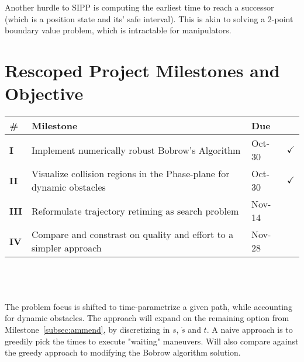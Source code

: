 \documentclass[letterpaper,11pt]{article} %
\begin{document}
Another hurdle to SIPP is computing the earliest time to reach a successor (which is a position state and its' safe interval). This is akin to solving a 2-point boundary value problem, which is intractable for manipulators.

\section*{Rescoped Project Milestones and Objective}

\begin{tabular}{|p{}|p{}|p{}|p{}|}
\hline
\textbf{\#} & \textbf{Milestone} & \textbf{Due} & \textbf{}\\
\hline

\textbf{I} & Implement numerically robust Bobrow's Algorithm & Oct-30 & $\checkmark$ \\
\hline

\textbf{II} & Visualize collision regions in the Phase-plane for dynamic obstacles & Oct-30 & $\checkmark$ \\
\hline

\textbf{III} & Reformulate trajectory retiming as search problem & Nov-14 & \\
\hline

\textbf{IV} & Compare and constrast on quality and effort to a simpler approach & Nov-28 & \\
\hline
\end{tabular}
\\
\\
\\
The problem focus is shifted to time-parametrize a given path, while accounting for dynamic obstacles. The approach will expand on the remaining option from Milestone~\ref{subsec:ammend}, by discretizing in $s$, $\dot{s}$ and $t$. A naive approach is to greedily pick the times to execute "waiting" maneuvers. Will also compare against the greedy approach to modifying the Bobrow algorithm solution.







\end{document}
